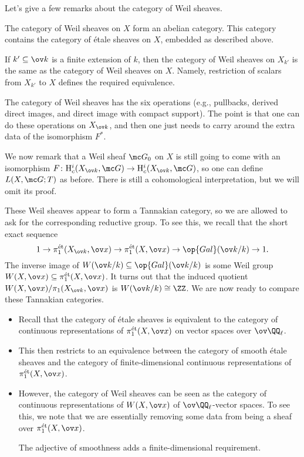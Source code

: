 \documentclass[../notes.tex]{subfiles}
\begin{document}
Let's give a few remarks about the category of Weil sheaves.
\begin{remark}
	The category of Weil sheaves on $X$ form an abelian category. This category contains the category of \'etale sheaves on $X$, embedded as described above.
\end{remark}
\begin{remark}
	If $k'\subseteq\ov k$ is a finite extension of $k$, then the category of Weil sheaves on $X_{k'}$ is the same as the category of Weil sheaves on $X$. Namely, restriction of scalars from $X_{k'}$ to $X$ defines the required equivalence.
\end{remark}
\begin{remark}
	The category of Weil sheaves has the six operations (e.g., pullbacks, derived direct images, and direct image with compact support). The point is that one can do these operations on $X_{\ov k}$, and then one just needs to carry around the extra data of the isomorphism $F^*$.
\end{remark}
We now remark that a Weil sheaf $\mc G_0$ on $X$ is still going to come with an isomorphism $F\colon\mathrm H^i_c(X_{\ov k},\mc G)\to\mathrm H^i_c(X_{\ov k},\mc G)$, so one can define $L(X,\mc G;T)$ as before. There is still a cohomological interpretation, but we will omit its proof.

These Weil sheaves appear to form a Tannakian category, so we are allowed to ask for the corresponding reductive group. To see this, we recall that the short exact sequence
\[1\to\pi_1^{\mathrm{\acute et}}(X_{\ov k},\ov x)\to\pi_1^{\mathrm{\acute et}}(X,\ov x)\to\op{Gal}(\ov k/k)\to1.\]
The inverse image of $W(\ov k/k)\subseteq\op{Gal}(\ov k/k)$ is some Weil group $W(X,\ov x)\subseteq\pi_1^{\mathrm{\acute et}}(X,\ov x)$. It turns out that the induced quotient $W(X,\ov x)/\pi_1(X_{\ov k},\ov x)$ is $W(\ov k/k)\cong\ZZ$. We are now ready to compare these Tannakian categories.
\begin{itemize}
	\item Recall that the category of \'etale sheaves is equivalent to the category of continuous representations of $\pi_1^{\mathrm{\acute et}}(X,\ov x)$ on vector spaces over $\ov\QQ_\ell$.
	\item This then restricts to an equivalence between the category of smooth \'etale sheaves and the category of finite-dimensional continuous representations of $\pi_1^{\mathrm{\acute et}}(X,\ov x)$.
	\item However, the category of Weil sheaves can be seen as the category of continuous representations of $W(X,\ov x)$ of $\ov\QQ_\ell$-vector spaces. To see this, we note that we are essentially removing some data from being a sheaf over $\pi_1^{\mathrm{\acute et}}(X,\ov x)$.

	The adjective of smoothness adds a finite-dimensional requirement.
\end{itemize}
\end{document}
